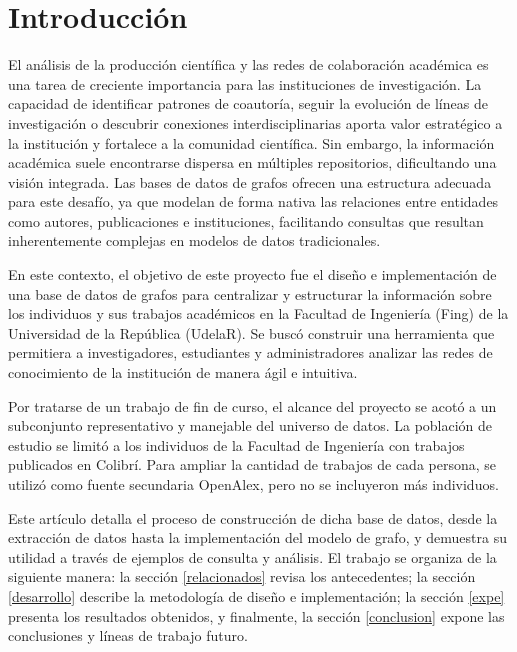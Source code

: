 \documentclass[journal]{IEEEtran}
\begin{document}
\section{Introducción}
\label{introduccion}
El análisis de la producción científica y las redes de colaboración académica es una tarea de creciente importancia para las instituciones de investigación. La capacidad de identificar patrones de coautoría, seguir la evolución de líneas de investigación o descubrir conexiones interdisciplinarias aporta valor estratégico a la institución y fortalece a la comunidad científica. Sin embargo, la información académica suele encontrarse dispersa en múltiples repositorios, dificultando una visión integrada. Las bases de datos de grafos ofrecen una estructura adecuada para este desafío, ya que modelan de forma nativa las relaciones entre entidades como autores, publicaciones e instituciones, facilitando consultas que resultan inherentemente complejas en modelos de datos tradicionales.

En este contexto, el objetivo de este proyecto fue el diseño e implementación de una base de datos de grafos para centralizar y estructurar la información sobre los individuos y sus trabajos académicos en la Facultad de Ingeniería (Fing) de la Universidad de la República (UdelaR). Se buscó construir una herramienta que permitiera a investigadores, estudiantes y administradores analizar las redes de conocimiento de la institución de manera ágil e intuitiva.

Por tratarse de un trabajo de fin de curso, el alcance del proyecto se acotó a un subconjunto representativo y manejable del universo de datos. La población de estudio se limitó a los individuos de la Facultad de Ingeniería con trabajos publicados en Colibrí. Para ampliar la cantidad de trabajos de cada persona, se utilizó como fuente secundaria OpenAlex, pero no se incluyeron más individuos.

Este artículo detalla el proceso de construcción de dicha base de datos, desde la extracción de datos hasta la implementación del modelo de grafo, y demuestra su utilidad a través de ejemplos de consulta y análisis. El trabajo se organiza de la siguiente manera: la sección \ref{relacionados} revisa los antecedentes; la sección \ref{desarrollo} describe la metodología de diseño e implementación; la sección \ref{expe} presenta los resultados obtenidos, y finalmente, la sección \ref{conclusion} expone las conclusiones y líneas de trabajo futuro.
\end{document}
